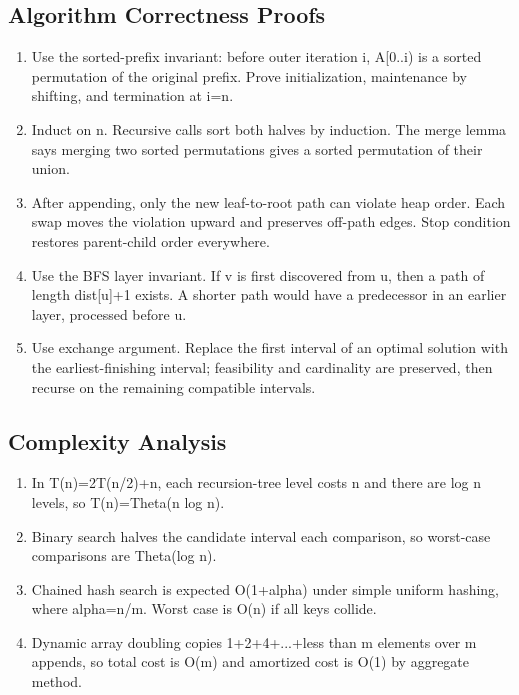 \documentclass[11pt]{ctexart}
\begin{document}
\subsection*{Algorithm Correctness Proofs}
\begin{enumerate}
  \item Use the sorted-prefix invariant: before outer iteration i, A[0..i) is a sorted permutation of the original prefix. Prove initialization, maintenance by shifting, and termination at i=n.
  \item Induct on n. Recursive calls sort both halves by induction. The merge lemma says merging two sorted permutations gives a sorted permutation of their union.
  \item After appending, only the new leaf-to-root path can violate heap order. Each swap moves the violation upward and preserves off-path edges. Stop condition restores parent-child order everywhere.
  \item Use the BFS layer invariant. If v is first discovered from u, then a path of length dist[u]+1 exists. A shorter path would have a predecessor in an earlier layer, processed before u.
  \item Use exchange argument. Replace the first interval of an optimal solution with the earliest-finishing interval; feasibility and cardinality are preserved, then recurse on the remaining compatible intervals.
\end{enumerate}

\subsection*{Complexity Analysis}
\begin{enumerate}
  \item In T(n)=2T(n/2)+n, each recursion-tree level costs n and there are log n levels, so T(n)=Theta(n log n).
  \item Binary search halves the candidate interval each comparison, so worst-case comparisons are Theta(log n).
  \item Chained hash search is expected O(1+alpha) under simple uniform hashing, where alpha=n/m. Worst case is O(n) if all keys collide.
  \item Dynamic array doubling copies 1+2+4+...+less than m elements over m appends, so total cost is O(m) and amortized cost is O(1) by aggregate method.
\end{enumerate}
\end{document}
